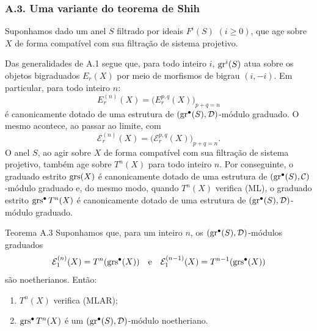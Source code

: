\subsubsection*{A.3. Uma variante do teorema de Shih}
Suponhamos dado um anel \(S\) filtrado por ideais \(F^i(S)\) \((i\ge0)\), que age sobre \(X\) de forma compatível com sua filtração de sistema projetivo.

Das generalidades de A.1 segue que, para todo inteiro \(i\), \(\operatorname{gr}^i(S)\) atua sobre os objetos bigraduados \(E_r(X)\) por meio de morfismos de bigrau \((i,-i)\). Em particular, para todo inteiro \(n\):
\[
E_r^{(n)}(X)=\bigl(E_r^{p,q}(X)\bigr)_{p+q=n}
\]
é canonicamente dotado de uma estrutura de \((\operatorname{gr}^\bullet(S),\mathcal D)\)-módulo graduado. O mesmo acontece, ao passar ao limite, com
\[
\mathcal E_r^{(n)}(X)=\bigl(\mathcal E_r^{p,q}(X)\bigr)_{p+q=n}.
\]
O anel \(S\), ao agir sobre \(X\) de forma compatível com sua filtração de sistema projetivo, também age sobre \(T^n(X)\) para todo inteiro \(n\). Por conseguinte, o graduado estrito \(\operatorname{grs}(X)\) é canonicamente dotado de uma estrutura de \((\operatorname{gr}^\bullet(S),\mathcal C)\)-módulo graduado e, do mesmo modo, quando \(T^n(X)\) verifica (ML), o graduado estrito \(\operatorname{grs}^\bullet T^n(X)\) é canonicamente dotado de uma estrutura de \((\operatorname{gr}^\bullet(S),\mathcal D)\)-módulo graduado.

\begin{statement}{Teorema A.3}
Suponhamos que, para um inteiro \(n\), os \((\operatorname{gr}^\bullet(S),\mathcal D)\)-módulos graduados
\[
\mathcal E_1^{(n)}(X)=T^n(\operatorname{grs}^\bullet(X))
\quad\text{e}\quad
\mathcal E_1^{(n-1)}(X)=T^{n-1}(\operatorname{grs}^\bullet(X))
\]
são noetherianos. Então:
\begin{enumerate}[label=\textup{(\roman*)}]
\item \(T^n(X)\) verifica (MLAR);
\item \(\operatorname{grs}^\bullet T^n(X)\) é um \((\operatorname{gr}^\bullet(S),\mathcal D)\)-módulo noetheriano.
\end{enumerate}
\end{statement}

